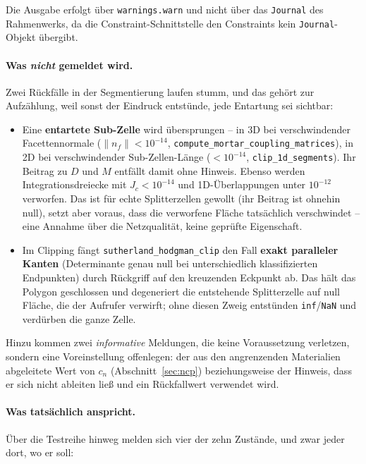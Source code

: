 \documentclass[a4paper,11pt]{article}
\def\bm#1{#1}%
\newcommand{\code}[1]{\texttt{\small #1}}
\begin{document}
\noindent Die Ausgabe erfolgt über \code{warnings.warn} und nicht über das \code{Journal} des
Rahmenwerks, da die Constraint-Schnittstelle den Constraints kein \code{Journal}-Objekt übergibt.

\paragraph{Was \emph{nicht} gemeldet wird.} Zwei Rückfälle in der Segmentierung laufen stumm, und
das gehört zur Aufzählung, weil sonst der Eindruck entstünde, jede Entartung sei sichtbar:
\begin{itemize}\itemsep2pt
  \item Eine \textbf{entartete Sub-Zelle} wird übersprungen -- in 3D bei verschwindender
        Facettennormale ($\|\bm n_f\|<10^{-14}$, \code{compute\_mortar\_coupling\_matrices}), in
        2D bei verschwindender Sub-Zellen-Länge ($<10^{-14}$, \code{clip\_1d\_segments}). Ihr
        Beitrag zu $\bm D$ und $\bm M$ entfällt damit ohne Hinweis. Ebenso werden
        Integrationsdreiecke mit $J_c<10^{-14}$ und 1D-Überlappungen unter $10^{-12}$ verworfen.
        Das ist für echte Splitterzellen gewollt (ihr Beitrag ist ohnehin null), setzt aber
        voraus, dass die verworfene Fläche tatsächlich verschwindet -- eine Annahme über die
        Netzqualität, keine geprüfte Eigenschaft.
  \item Im Clipping fängt \code{sutherland\_hodgman\_clip} den Fall \textbf{exakt paralleler
        Kanten} (Determinante genau null bei unterschiedlich klassifizierten Endpunkten) durch
        Rückgriff auf den kreuzenden Eckpunkt ab. Das hält das Polygon geschlossen und
        degeneriert die entstehende Splitterzelle auf null Fläche, die der Aufrufer verwirft;
        ohne diesen Zweig entstünden \code{inf}/\code{NaN} und verdürben die ganze Zelle.
\end{itemize}

\medskip
\noindent Hinzu kommen zwei \emph{informative} Meldungen, die keine Voraussetzung verletzen, sondern eine
Voreinstellung offenlegen: der aus den angrenzenden Materialien abgeleitete Wert von $c_n$
(Abschnitt~\ref{sec:ncp}) beziehungsweise der Hinweis, dass er sich nicht ableiten ließ und ein
Rückfallwert verwendet wird.

\paragraph{Was tatsächlich anspricht.}
Über die Testreihe hinweg melden sich vier der zehn Zustände, und zwar jeder dort, wo er soll:
\end{document}
